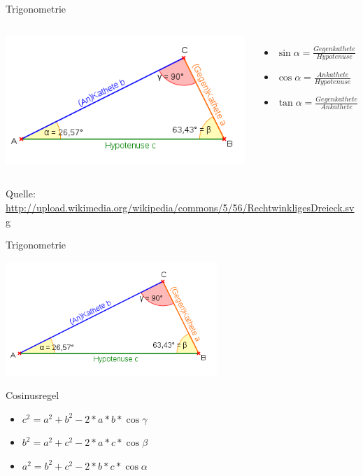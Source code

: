 \begin{frame}{Trigonometrie}
	\begin{columns}
	\includegraphics[width=1.1\textwidth,height=.8\textheight,keepaspectratio]{dreieck.png}
	\begin{itemize}
		\item $\sin \alpha = \frac{Gegenkathete}{Hypotenuse}$
		\item $\cos \alpha = \frac{Ankathete}{Hypotenuse}$
		\item $\tan \alpha = \frac{Gegenkathete}{Ankathete}$
	\end{itemize}
	\end{columns}
	Quelle: \url{http://upload.wikimedia.org/wikipedia/commons/5/56/RechtwinkligesDreieck.svg}
\end{frame}

\begin{frame}{Trigonometrie}
	\begin{center}
		\includegraphics[width=0.6\textwidth,height=.8\textheight,keepaspectratio]{dreieck.png}
	\end{center}
	
	\begin{block}{Cosinusregel}
		\begin{itemize}
			\item $c^2 = a^2 + b^2 - 2 * a * b * \cos \gamma$
			\item $b^2 = a^2 + c^2 - 2 * a * c * \cos \beta$
			\item $a^2 = b^2 + c^2 - 2 * b * c * \cos \alpha$
		\end{itemize}
	\end{block}
\end{frame}


